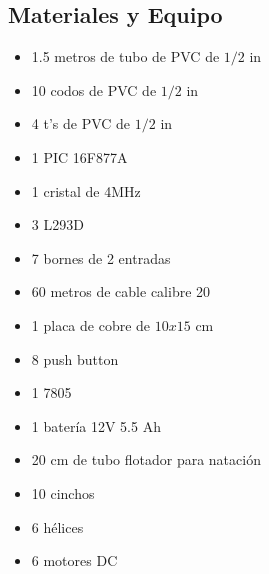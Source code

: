 \pagebreak
\subsection{Materiales y Equipo}
\begin{multicols}{2}
\begin{itemize}
 \item 1.5 metros de tubo de PVC de $1/2$ in
 \item 10 codos de PVC de $1/2$ in
 \item 4 t's de PVC de $1/2$ in
 \item 1 PIC 16F877A
 \item 1 cristal de 4MHz
 \item 3 L293D
 \item 7 bornes de 2 entradas
 \item 60 metros de cable calibre 20
 \item 1 placa de cobre de $10 x 15$ cm
 \item 8 push button
 \item 1 7805
 \item 1 bater\'ia 12V 5.5 Ah
 \item 20 cm de tubo flotador para nataci\'on
 \item 10 cinchos
 \item 6 h\'elices
 \item 6 motores DC
\end{itemize}
\end{multicols}
